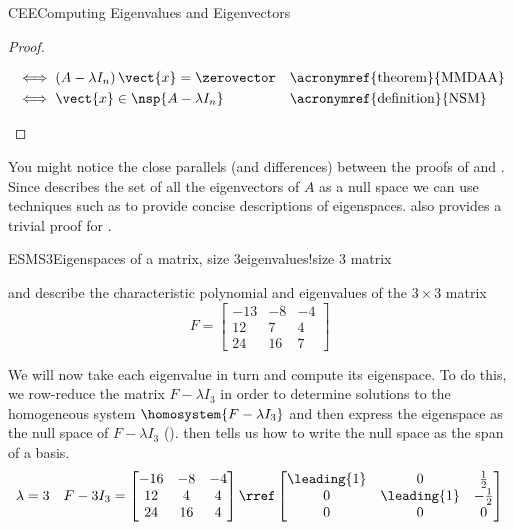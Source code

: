 \begin{subsect}{CEE}{Computing Eigenvalues and Eigenvectors}
\begin{proof}
\begin{para}
\begin{align*}
&\iff\left(A-\lambda I_n\right)\vect{x}=\zerovector&&\text{\acronymref{theorem}{MMDAA}}\\
&\iff\vect{x}\in\nsp{A-\lambda I_n}&&\text{\acronymref{definition}{NSM}}
\end{align*}
\end{para}
%
\end{proof}
%
\begin{para}You might notice the close parallels (and differences) between the proofs of  and .  Since  describes the set of all the eigenvectors of $A$ as a null space we can use techniques such as  to provide concise descriptions of eigenspaces.   also provides a trivial proof for .\end{para}
%
\begin{example}{ESMS3}{Eigenspaces of a matrix, size 3}{eigenvalues!size 3 matrix}
\begin{para} and  describe the characteristic polynomial and eigenvalues of the $3\times 3$ matrix
%
\begin{equation*}
F=
\begin{bmatrix}
-13 & -8 & -4\\
12 & 7 & 4\\
24 & 16 & 7
\end{bmatrix}
\end{equation*}
\end{para}
%
\begin{para}We will now take each eigenvalue in turn and compute its eigenspace.  To do this, we row-reduce the matrix
$F-\lambda I_3$ in order to determine solutions to the homogeneous system $\homosystem{F-\lambda I_3}$ and then express the eigenspace as the null space of $F-\lambda I_3$ ().   then tells us how to write the null space as the span of a basis.
%
\begin{align*}
%
\lambda&=3&F-3I_3&=
\begin{bmatrix}
-16 & -8 & -4\\
12 & 4 & 4\\
24 & 16 & 4
\end{bmatrix}
\rref
\begin{bmatrix}
\leading{1} & 0 & \frac{1}{2}\\
0 & \leading{1} & -\frac{1}{2}\\
0 & 0 & 0
\end{bmatrix}\\

\end{align*}
\end{para}
\end{example}
\end{subsect}
